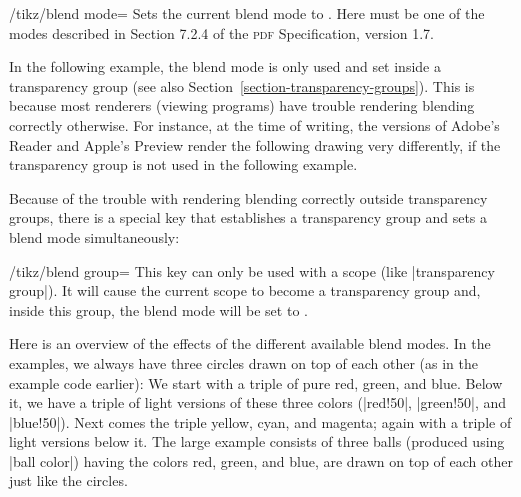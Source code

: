 \begin{key}{/tikz/blend mode=}
  Sets the current blend mode to . Here  must be
  one of the modes described in Section 7.2.4 of the \textsc{pdf}
  Specification, version 1.7.

  In the following example, the blend mode is only used and set inside
  a transparency group (see also
  Section~\ref{section-transparency-groups}). This is because most
  renderers (viewing 
  programs) have trouble rendering blending correctly otherwise. For
  instance, at the time of writing, the versions of Adobe's Reader and
  Apple's Preview render the following drawing very differently, if
  the transparency group is not used in the following example.

\begin{codeexample}[]
\end{codeexample}

  Because of the trouble with rendering blending correctly outside
  transparency groups, there is a special key that establishes a
  transparency group and sets a blend mode simultaneously:
  
  \begin{key}{/tikz/blend group=}
    This key can only be used with a scope (like
    |transparency group|). It will cause the current scope to become a
    transparency group and, inside this group, the blend mode will be
    set to .

\begin{codeexample}[]
\end{codeexample}
  \end{key}

  Here is an overview of the effects of the different available blend
  modes. In the examples, we always have three circles drawn on
  top of each other (as in the example code earlier): We start with a
  triple of pure red, green, and blue. Below it, we have a triple of
  light versions of these three colors (|red!50|, |green!50|, and
  |blue!50|). Next comes the triple  yellow, cyan, and magenta; again
  with a triple of light versions below it. The large example consists
  of three balls (produced using |ball color|) having the colors red,
  green, and blue, are drawn on top of each other just like the
  circles.  
  

\end{key}
